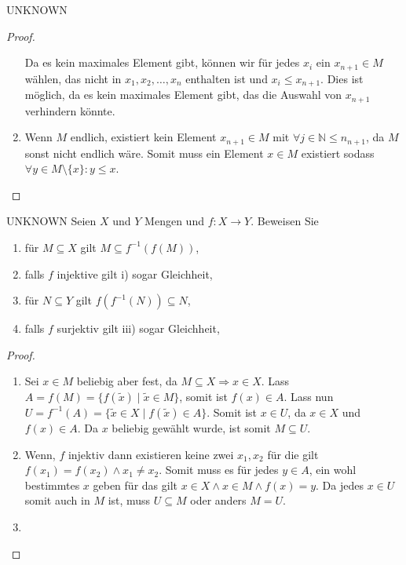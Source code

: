 \documentclass{problemset}
\begin{document}
\begin{problem}{UNKNOWN}
\begin{proof}
\begin{enumerate}[label=\roman*)]
              Da es kein maximales Element gibt, können wir für jedes $x_i$ ein $x_{n+1} \in M$ wählen, das nicht in ${x_1, x_2, \ldots, x_n}$ enthalten ist und $x_i \leq x_{n+1}$. Dies ist möglich, da es kein maximales Element gibt, das die Auswahl von $x_{n+1}$ verhindern könnte.
              \checkmark
        \item
              Wenn $M$ endlich, existiert kein Element $x_{n+1} \in M$ mit $\forall j \in \mathbb{N} \le n_{n+1}$, da $M$ sonst nicht endlich wäre.
              Somit muss ein Element $x \in M$ existiert sodass $\forall y \in M \setminus \{x\}: y \le x$.
              \checkmark
    \end{enumerate}
\end{proof}
\end{problem}

\begin{problem}{UNKNOWN}
Seien $X$ und $Y$ Mengen und $f : X \rightarrow Y$. Beweisen Sie
\begin{enumerate}[label=\roman*)]
    \item für $M \subseteq X$ gilt $M \subseteq f^{-1}(f(M))$,
    \item falls $f$ injektive gilt i) sogar Gleichheit,
    \item für $N \subseteq Y$ gilt $f(f^{-1}(N)) \subseteq N$,
    \item falls $f$ surjektiv gilt iii) sogar Gleichheit,
\end{enumerate}
\begin{proof}
    \leavevmode
    \begin{enumerate}[label=\roman*)]
        \item
              Sei $x \in M$ beliebig aber fest, da $M \subseteq X \Rightarrow x \in X$.
              Lass $A = f(M) = \{f(\tilde{x}) \mid \tilde{x} \in M\}$, somit ist $f(x) \in A$.
              Lass nun $U = f^{-1}(A) = \{\tilde{x} \in X \mid f(\tilde{x}) \in A\}$.
              Somit ist $x \in U$, da $x \in X$ und $f(x) \in A$.
              Da $x$ beliebig gewählt wurde, ist somit $M \subseteq U$. \checkmark
        \item
              Wenn, $f$ injektiv dann existieren keine zwei $x_1, x_2$ für die gilt $f(x_1) = f(x_2) \land x_1 \not= x_2$.
              Somit muss es für jedes $y \in A$, ein wohl bestimmtes $x$ geben für das gilt $x \in X \land x \in M \land f(x) = y$.
              Da jedes $x \in U$ somit auch in $M$ ist, muss $U \subseteq M$ oder anders $M = U$. \checkmark
        \item

\end{enumerate}
\end{proof}
\end{problem}
\end{document}
